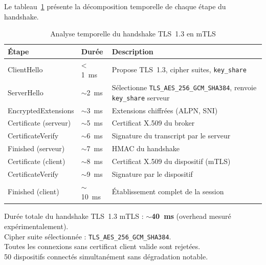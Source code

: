Le tableau~\ref{tab:handshake_tls} présente la décomposition temporelle de chaque étape du handshake.

\begin{table}[H]
\centering
\caption{Analyse temporelle du handshake TLS~1.3 en mTLS}
\label{tab:handshake_tls}
\begin{tabular}{llp{6cm}}
\toprule
\textbf{Étape} & \textbf{Durée} & \textbf{Description} \\
\midrule
ClientHello & < 1~ms & Propose TLS~1.3, cipher suites, \texttt{key\_share} \\
ServerHello & $\sim$2~ms & Sélectionne \texttt{TLS\_AES\_256\_GCM\_SHA384}, renvoie \texttt{key\_share} serveur \\
EncryptedExtensions & $\sim$3~ms & Extensions chiffrées (ALPN, SNI) \\
Certificate (serveur) & $\sim$5~ms & Certificat X.509 du broker \\
CertificateVerify & $\sim$6~ms & Signature du transcript par le serveur \\
Finished (serveur) & $\sim$7~ms & HMAC du handshake \\
Certificate (client) & $\sim$8~ms & Certificat X.509 du dispositif (mTLS) \\
CertificateVerify & $\sim$9~ms & Signature par le dispositif \\
Finished (client) & $\sim$10~ms & Établissement complet de la session \\
\bottomrule
\end{tabular}
\end{table}

\begin{resultbox}
Durée totale du handshake TLS~1.3 mTLS : \textbf{$\sim$40~ms} (overhead mesuré expérimentalement).\\
Cipher suite sélectionnée : \texttt{TLS\_AES\_256\_GCM\_SHA384}.\\
Toutes les connexions sans certificat client valide sont rejetées.\\
50 dispositifs connectés simultanément sans dégradation notable.
\end{resultbox}
